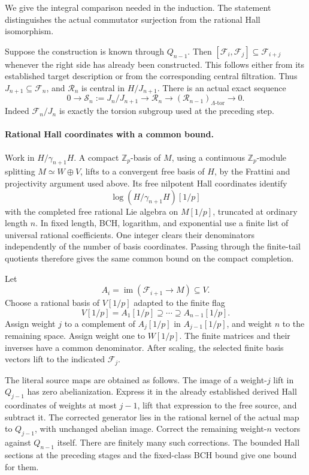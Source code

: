 We give the integral comparison needed in the induction.
The statement distinguishes the actual commutator surjection
from the rational Hall isomorphism.

Suppose the construction is known through \(Q_{n-1}\).  Then
\([\mathcal F_i,\mathcal F_j]\subseteq \mathcal F_{i+j}\) whenever the right side has
already been constructed.  This follows either from its
established target description or from the corresponding
central filtration.  Thus \(J_{n+1}\subseteq \mathcal F_n\), and \(\mathcal R_n\)
is central in \(H/J_{n+1}\).  There is an actual exact sequence
\begin{equation}\label{eq:uniform-central-sequence}
 0\longrightarrow \mathcal S_n:=J_n/J_{n+1}
 \longrightarrow \mathcal R_n
 \longrightarrow (\mathcal R_{n-1})_{\Lambda\text{-tor}}
 \longrightarrow0.
\end{equation}
Indeed \(\mathcal F_n/J_n\) is exactly the torsion subgroup used at the
preceding step.

\paragraph{Rational Hall coordinates with a common bound.}
Work in \(H/\gamma_{n+1}H\).  A compact
\(\mathbb Z_p\)-basis of \(M\), using a continuous \(\mathbb Z_p\)-module splitting \(M\simeq W\oplus V\), lifts to a convergent
free basis of \(H\), by the Frattini and projectivity argument
used above.  Its free nilpotent Hall coordinates identify
\[
       \log(H/\gamma_{n+1}H)[1/p]
\]
with the completed free rational Lie algebra on \(M[1/p]\),
truncated at ordinary length \(n\).
In fixed length, BCH, logarithm, and exponential use a finite
list of universal rational coefficients.  One integer clears
their denominators independently of the number of basis
coordinates.  Passing through the finite-tail quotients
therefore gives the same common bound on the compact completion.

Let
\[
 A_i=\operatorname{im}(\mathcal F_{i+1}\longrightarrow M)\subseteq V.
\]
Choose a rational basis of \(V[1/p]\) adapted to the finite flag
\[
 V[1/p]=A_1[1/p]\supseteq\cdots\supseteq A_{n-1}[1/p].
\]
Assign weight \(j\) to a complement of \(A_j[1/p]\) in
\(A_{j-1}[1/p]\), and weight \(n\) to the remaining space.
Assign weight one to \(W[1/p]\).
The finite matrices and their inverses have a common denominator.
After scaling, the selected finite basis vectors lift to the
indicated \(\mathcal F_j\).

The literal source maps are obtained as follows.  The image of
a weight-\(j\) lift in \(Q_{j-1}\) has zero abelianization.
Express it in the already established derived Hall coordinates
of weights at most \(j-1\), lift that expression to the free
source, and subtract it.  The corrected generator lies in the
rational kernel of the actual map to \(Q_{j-1}\), with unchanged
abelian image.  Correct the remaining weight-\(n\) vectors
against \(Q_{n-1}\) itself.  There are finitely many such
corrections.  The bounded Hall sections at the preceding
stages and the fixed-class BCH bound give one bound for them.

